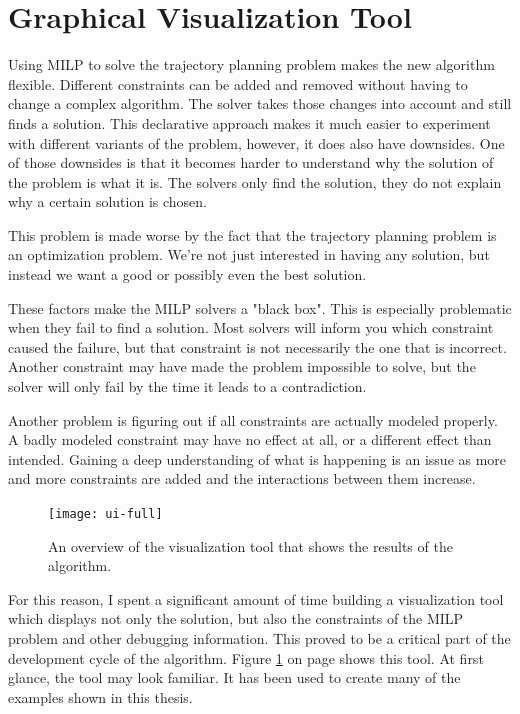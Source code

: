 \section{Graphical Visualization Tool }
\label{section:visual}
Using MILP to solve the trajectory planning problem makes the new algorithm flexible. Different constraints can be added and removed without having to change a complex algorithm. The solver takes those changes into account and still finds a solution.
This declarative approach makes it much easier to experiment with different variants of the problem, however, it does also have downsides. One of those downsides is that it becomes harder to understand why the solution of the problem is what it is. The solvers only find the solution, they do not explain why a certain solution is chosen.
\par
This problem is made worse by the fact that the trajectory planning problem is an optimization problem. We're not just interested in having any solution, but instead we want a good or possibly even the best solution.
\par
These factors make the MILP solvers a "black box". This is especially problematic when they fail to find a solution. Most solvers will inform you which constraint caused the failure, but that constraint is not necessarily the one that is incorrect. Another constraint may have made the problem impossible to solve, but the solver will only fail by the time it leads to a contradiction.
\par
Another problem is figuring out if all constraints are actually modeled properly. A badly modeled constraint may have no effect at all, or a different effect than intended. Gaining a deep understanding of what is happening is an issue as more and more constraints are added and the interactions between them increase.
\par
\begin{figure}
	\centering
    \texttt{[image: ui-full]}
    \caption[An overview of the visualization tool]{An overview of the visualization tool that shows the results of the algorithm.}
    \label{fig:ui-full}     
\end{figure}
For this reason, I spent a significant amount of time building a visualization tool which displays not only the solution, but also the constraints of the MILP problem and other debugging information. This proved to be a critical part of the development cycle of the algorithm. Figure \ref{fig:ui-full} on page \pageref{fig:ui-full} shows this tool. At first glance, the tool may look familiar. It has been used to create many of the examples shown in this thesis. 
